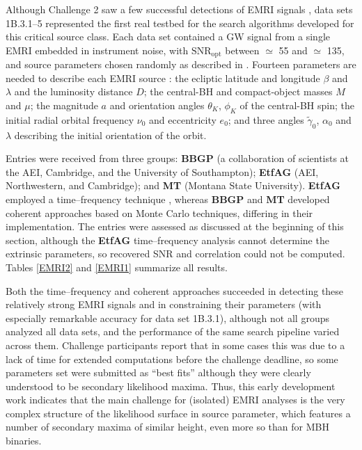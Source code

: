 \documentclass{iopart}
\begin{document}
Although Challenge 2 saw a few successful detections of EMRI signals \cite{mldcamaldi2}, data sets 1B.3.1--5 represented the first real testbed for the search algorithms developed for this critical source class. Each data set contained a GW signal from a single EMRI embedded in instrument noise, with $\mathrm{SNR}_\mathrm{opt}$ between $\simeq$ 55 and $\simeq$ 135, and source parameters chosen randomly as described in \cite{mldcgwdaw2}. Fourteen parameters are needed to describe each EMRI source \cite{mldcgwdaw2}: 
the ecliptic latitude and longitude $\beta$ and $\lambda$ and the luminosity distance $D$; the central-BH and compact-object masses $M$ and $\mu$;  the magnitude $a$ and orientation angles $\theta_K$, $\phi_K$ of the central-BH spin; the initial radial orbital frequency $\nu_0$ and eccentricity $e_0$; and three angles $\tilde{\gamma}_0$, $\alpha_0$ and $\lambda$ describing the initial orientation of the orbit.

Entries were received from three groups: \textbf{BBGP} (a collaboration of scientists at the AEI, Cambridge, and the University of Southampton); \textbf{EtfAG} (AEI, Northwestern, and Cambridge); and \textbf{MT} (Montana State University).
\textbf{EtfAG} employed a time--frequency technique \cite{gmw}, whereas \textbf{BBGP} \cite{bbgpemri} and \textbf{MT} \cite{cornishemri} developed coherent approaches based on Monte Carlo techniques, differing in their implementation.
The entries were assessed as discussed at the beginning of this section, although the \textbf{EtfAG} time--frequency analysis cannot determine the extrinsic parameters, so recovered SNR and correlation could not be computed. Tables \ref{EMRI2} and \ref{EMRI1} summarize all results.

Both the time--frequency and coherent approaches succeeded in detecting these relatively strong EMRI signals and in constraining their parameters (with especially remarkable accuracy for data set 1B.3.1), although not all groups analyzed all data sets, and the performance of the same search pipeline varied across them. Challenge participants report that in some cases this was due to a lack of time for extended computations before the challenge deadline, so some parameters set were submitted as ``best fits'' although they were clearly understood to be secondary likelihood maxima. Thus, this early development work indicates that the main challenge for (isolated) EMRI analyses is the very complex structure of the likelihood surface in source parameter, which features a number of secondary maxima of similar height, even more so than for MBH binaries.
\end{document}
